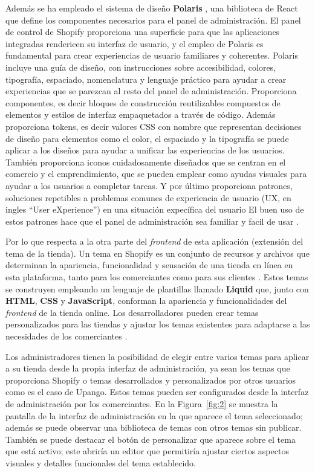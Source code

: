\documentclass[11pt]{article}
\begin{document}
Además se ha empleado el sistema de diseño \textbf{Polaris} \cite{polaris}, una biblioteca de React que define los componentes necesarios para el panel de administración.
El panel de control de Shopify proporciona una superficie para que las aplicaciones integradas rendericen su interfaz de usuario, y el empleo de Polaris
es fundamental para crear experiencias de usuario familiares y coherentes.
Polaris incluye una guía de diseño, con instrucciones sobre accesibilidad, colores, tipografía, espaciado, nomenclatura y lenguaje práctico para ayudar 
a crear experiencias que se parezcan al resto del panel de administración. Proporciona componentes, es decir bloques de construcción reutilizables compuestos de 
elementos y estilos de interfaz empaquetados a través de código. Además proporciona tokens, es decir valores CSS con nombre que representan decisiones
de diseño para elementos como el color, el espaciado y la tipografía se puede aplicar a los diseños para ayudar a unificar las experiencias de los usuarios.
También proporciona iconos cuidadosamente diseñados que se centran en el comercio y el emprendimiento, que se pueden emplear como ayudas visuales para ayudar a los 
usuarios a completar tareas. Y por último proporciona patrones, soluciones repetibles a problemas comunes de experiencia de usuario (UX, en ingles ``User eXperience'') en una situación expecífica del usuario
El buen uso de estos patrones hace que el panel de administración sea familiar y facil de usar \cite{shopify-dev}.

Por lo que respecta a la otra parte del \textit{frontend} de esta aplicación (extensión del tema de la tienda). Un tema en Shopify es un conjunto de recursos
y archivos que determinan la apariencia, funcionalidad y sensación de una tienda en línea en esta plataforma, tanto para los comerciantes como para
sus clientes \cite{theme}. Estos temas se construyen empleando un lenguaje de plantillas llamado \textbf{Liquid} \cite{liquid} que, junto con \textbf{HTML}, \textbf{CSS} y \textbf{JavaScript}, conforman la apariencia
y funcionalidades del \textit{frontend} de la tienda online. Los desarrolladores pueden crear temas personalizados para las tiendas y ajustar los temas existentes 
para adaptarse a las necesidades de los comerciantes \cite{shopify-dev}. 

Los administradores tienen la posibilidad de elegir entre varios temas para aplicar a su tienda desde la propia interfaz de administración,
ya sean los temas que proporciona Shopify o temas desarrollados y personalizados por otros usuarios como es el caso de Upango. Estos temas pueden ser
configurados desde la interfaz de administración por los comerciantes.
En la Figura~\ref{fig:2} se muestra la pantalla de la interfaz de administración en la que aparece el tema seleccionado; además se puede observar una 
biblioteca de temas con otros temas sin publicar. También se puede destacar el botón de personalizar que aparece
sobre el tema que está activo; este abriría un editor que permitiría ajustar ciertos aspectos visuales y detalles funcionales del tema establecido.
\end{document}
